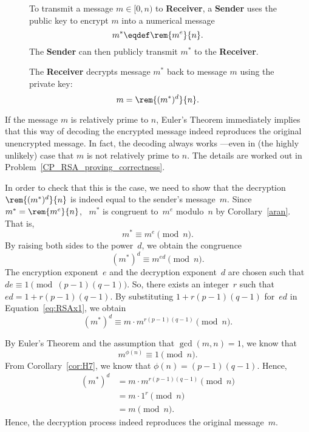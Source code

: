\begin{figure}[p]
{\begin{minipage}{\textwidth}
\begin{description}
To transmit a message $m \in [0,n)$ to \textbf{Receiver}, a \textbf{Sender} uses the public
  key to encrypt $m$ into a numerical message
\[
m^* \eqdef \rem{m^e}{n}.
\]
The \textbf{Sender} can then publicly transmit $m^*$ to the \textbf{Receiver}.

\item[Decoding] The \textbf{Receiver} decrypts message $m^*$ back to message $m$ using the
  private key:
\[
m = \rem{(m^*)^d}{n}.
\]

\end{description}

\end{minipage}
}
\end{figure}


If the message $m$ is relatively prime to $n$, Euler's Theorem
immediately implies that this way of decoding the encrypted message
indeed reproduces the original unencrypted message.  In fact, the
decoding always works ---even in (the highly unlikely) case that $m$
is not relatively prime to $n$.  The details are worked out in
Problem~\ref{CP_RSA_proving_correctness}.

\begin{editingnotes}
In order to check that this is the case, we need to show that the decryption
$\rem{(m^*)^d}{n}$ is indeed equal to the sender's message~$m$.  Since $m^* =
\rem{m^e}{n}$, \ $m^*$ is congruent to~$m^e$ modulo~$n$ by Corollary~\ref{aran}.  That is,
\begin{equation*}
    m^* \equiv m^e \pmod n.
\end{equation*}
By raising both sides to the power~$d$, we obtain the congruence
\begin{equation}\label{eq:RSAx1}
    (m^*)^d \equiv m^{ed} \pmod n.
\end{equation}
The encryption exponent~$e$ and the decryption exponent~$d$ are chosen such that $de \equiv
1 \pmod{(p - 1)(q - 1)}$.  So, there exists an integer~$r$ such that $ed = 1 + r(p - 1)(q -
1)$.  By substituting $1 + r(p - 1)(q - 1)$ for~$ed$ in Equation~\ref{eq:RSAx1}, we obtain
\begin{equation}\label{eq:RSAx2}
    (m^*)^d \equiv m \cdot m^{r(p - 1)(q - 1)} \pmod n.
\end{equation}

By Euler's Theorem and the assumption that $\gcd(m, n) = 1$, we know that
\begin{equation*}
    m^{\phi(n)} \equiv 1 \pmod n.
\end{equation*}
From Corollary~\ref{cor:H7}, we know that $\phi(n) = (p - 1)(q - 1)$.  Hence,
\begin{align*}
(m^*)^d &= m \cdot m^{r(p-1)(q-1)} \pmod{n} \\ &= m \cdot 1^{r} \pmod{n} \\ &= m \pmod{n}.
\end{align*}
Hence, the decryption process indeed reproduces the original message~$m$.
\end{editingnotes}

